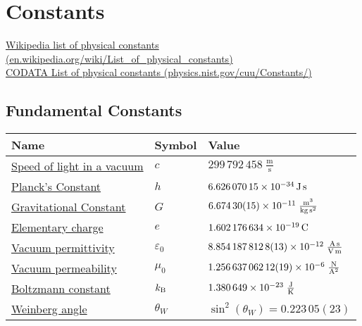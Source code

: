 \section{Constants}
	\href{https://en.wikipedia.org/wiki/List_of_physical_constants}{Wikipedia list of physical constants (en.wikipedia.org/wiki/List\_of\_physical\_constants)}\\
	\href{https://physics.nist.gov/cuu/Constants/}{CODATA List of physical constants (physics.nist.gov/cuu/Constants/)}
	\subsection{Fundamental Constants}
		\begin{center}
			\begin{tabular}{| L{.35\textwidth} L{.15\textwidth} L{.4\textwidth} |}
				\hline Name & Symbol & Value \\ \hline \hline
				\href{https://en.wikipedia.org/wiki/Speed_of_light}{Speed of light in a vacuum} & $c$ & $299\,792\,458\;\frac{\mathrm{m}}{\mathrm{s}}$ \exact \\ \hline
				\href{https://en.wikipedia.org/wiki/Planck_constant}{Planck's Constant} & $h$ & $6.626\,070\,15\times 10^{-34}\,\mathrm{J\,s}$ \exact \\ \hline
				\href{https://en.wikipedia.org/wiki/Gravitational_constant}{Gravitational Constant} & $G$ & $6.674\,30(15)\times 10^{-11}\;\frac{\mathrm{m^3}}{\mathrm{kg\,s^2}} $ \\ \hline
				\href{https://en.wikipedia.org/wiki/Elementary_charge}{Elementary charge} & $e$ & $1.602\,176\,634\times 10^{-19}\,\mathrm{C}$ \exact \\ \hline
				\href{https://en.wikipedia.org/wiki/Vacuum_permittivity}{Vacuum permittivity}  & $\varepsilon_0$ & $8.854\,187\,812\,8(13)\times 10^{-12}\;\frac{\mathrm{A\,s}}{\mathrm{V\,m}}$ \\ \hline
				\href{https://en.wikipedia.org/wiki/Vacuum_permeability}{Vacuum permeability}  & $\mu_0$ & $1.256\,637\,062\,12(19)\times 10^{-6}\;\frac{\mathrm{N}}{\mathrm{A^2}}$ \\ \hline
				\href{https://en.wikipedia.org/wiki/Boltzmann_constant}{Boltzmann constant} & $k_{\text{B}}$ & $1.380\,649\times 10^{-23}\;\frac{\mathrm{J}}{\mathrm{K}}$ \exact \\ \hline
				\href{https://en.wikipedia.org/wiki/Weinberg_angle}{Weinberg angle} & $\theta_W$ & $\sin^2(\theta_W) = 0.223\,05(23)$ \\ \hline
			\end{tabular}
		\end{center}

